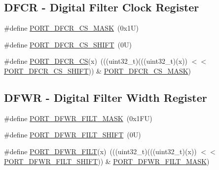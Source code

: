 \subsection*{D\+F\+CR -\/ Digital Filter Clock Register}
\begin{DoxyCompactItemize}
\item 
\#define \mbox{\hyperlink{group___p_o_r_t___register___masks_gadc66969dfb648b725cd30df406f7a2f9}{P\+O\+R\+T\+\_\+\+D\+F\+C\+R\+\_\+\+C\+S\+\_\+\+M\+A\+SK}}~(0x1\+U)
\item 
\#define \mbox{\hyperlink{group___p_o_r_t___register___masks_gac739bd97cc0b19198e8daa335c984500}{P\+O\+R\+T\+\_\+\+D\+F\+C\+R\+\_\+\+C\+S\+\_\+\+S\+H\+I\+FT}}~(0\+U)
\item 
\#define \mbox{\hyperlink{group___p_o_r_t___register___masks_ga3cf2c4c253ca645f6c93c5f2237a88c3}{P\+O\+R\+T\+\_\+\+D\+F\+C\+R\+\_\+\+CS}}(x)~(((uint32\+\_\+t)(((uint32\+\_\+t)(x)) $<$$<$ \mbox{\hyperlink{group___p_o_r_t___register___masks_gac739bd97cc0b19198e8daa335c984500}{P\+O\+R\+T\+\_\+\+D\+F\+C\+R\+\_\+\+C\+S\+\_\+\+S\+H\+I\+FT}})) \& \mbox{\hyperlink{group___p_o_r_t___register___masks_gadc66969dfb648b725cd30df406f7a2f9}{P\+O\+R\+T\+\_\+\+D\+F\+C\+R\+\_\+\+C\+S\+\_\+\+M\+A\+SK}})
\end{DoxyCompactItemize}
\subsection*{D\+F\+WR -\/ Digital Filter Width Register}
\begin{DoxyCompactItemize}
\item 
\#define \mbox{\hyperlink{group___p_o_r_t___register___masks_gaf2f0bbe1dea504156dce840fdcb94b74}{P\+O\+R\+T\+\_\+\+D\+F\+W\+R\+\_\+\+F\+I\+L\+T\+\_\+\+M\+A\+SK}}~(0x1\+F\+U)
\item 
\#define \mbox{\hyperlink{group___p_o_r_t___register___masks_ga9045bd83bc548178d057bf4916c8fe08}{P\+O\+R\+T\+\_\+\+D\+F\+W\+R\+\_\+\+F\+I\+L\+T\+\_\+\+S\+H\+I\+FT}}~(0\+U)
\item 
\#define \mbox{\hyperlink{group___p_o_r_t___register___masks_gad79add2c6df026fd06198143aa198c99}{P\+O\+R\+T\+\_\+\+D\+F\+W\+R\+\_\+\+F\+I\+LT}}(x)~(((uint32\+\_\+t)(((uint32\+\_\+t)(x)) $<$$<$ \mbox{\hyperlink{group___p_o_r_t___register___masks_ga9045bd83bc548178d057bf4916c8fe08}{P\+O\+R\+T\+\_\+\+D\+F\+W\+R\+\_\+\+F\+I\+L\+T\+\_\+\+S\+H\+I\+FT}})) \& \mbox{\hyperlink{group___p_o_r_t___register___masks_gaf2f0bbe1dea504156dce840fdcb94b74}{P\+O\+R\+T\+\_\+\+D\+F\+W\+R\+\_\+\+F\+I\+L\+T\+\_\+\+M\+A\+SK}})
\end{DoxyCompactItemize}


